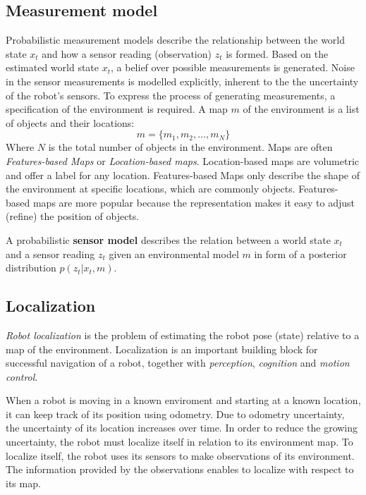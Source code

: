 {		\subsection{Measurement model}
		\label{sec:measurement_model}
Probabilistic measurement models describe the relationship between the world state $x_t$ and how a sensor reading (observation) $z_t$ is formed.
Based on the estimated world state $x_t$, a belief over possible measurements is generated.
Noise in the sensor measurements is modelled explicitly, inherent to the the uncertainty of the robot's sensors.
To express the process of generating measurements, a specification of the environment is required.
A map $m$ of the environment is a list of objects and their locations:
\begin{equation}
m = \{m_1, m_2, \hdots, m_N\}
\end{equation}
Where $N$ is the total number of objects in the environment.
Maps are often \textit{Features-based Maps} or \textit{Location-based maps}.
Location-based maps are volumetric and offer a label for any location.
Features-based Maps only describe the shape of the environment at specific locations, which are commonly objects.
Features-based maps are more popular because the representation makes it easy to adjust (refine) the position of objects.
\begin{mydef}
A probabilistic \textbf{sensor model} describes the relation between a world state $x_t$ and a sensor reading $z_t$ given an environmental model $m$ in form of a posterior distribution $p (z_t | x_t, m)$.
\end{mydef}


		\subsection{Localization}
\textit{Robot localization} is the problem of estimating the robot pose (state) relative to a map of the environment.
Localization is an important building block for successful navigation of a robot, together with \textit{perception}, \textit{cognition} and \textit{motion control}.

When a robot is moving in a known enviroment and starting at a known location, it can keep track of its position using odometry.
Due to odometry uncertainty, the uncertainty of its location increases over time.
In order to reduce the growing uncertainty, the robot must localize itself in relation to its environment map.
To localize itself, the robot uses its sensors to make observations of its environment.
The information provided by the observations enables to localize with respect to its map.

}

